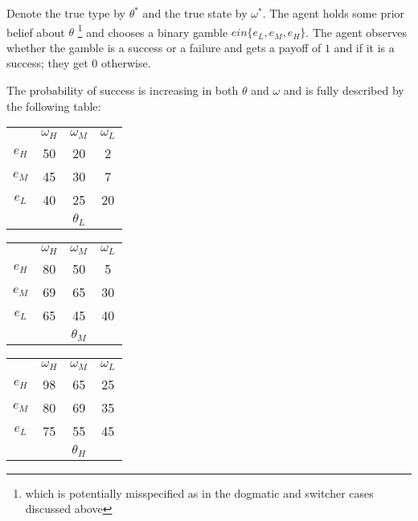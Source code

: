 \documentclass[
  12pt,
]{article}
\begin{document}
Denote the true type by \(\theta^*\) and the true state by \(\omega^*\).
The agent holds some prior belief about \(\theta\)
\footnote{which is potentially misspecified as in the dogmatic and switcher cases discussed above}
and chooses a binary gamble \(e in \{e_L, e_M, e_H\}\). The agent
observes whether the gamble is a success or a failure and gets a payoff
of \(1\) and if it is a success; they get \(0\) otherwise.

The probability of success is increasing in both \(\theta\) and
\(\omega\) and is fully described by the following table:

\begin{tabular}{ c|c|c|c|}
  
  \multicolumn{1}{c}{} & \multicolumn{1}{c}{$\omega_H$} & \multicolumn{1}{c}{$\omega_M$} & \multicolumn{1}{c}{$\omega_L$}\\
  \cline{2-4}
  $e_H$ & 50 & 20 & 2 \\
  \cline{2-4}
  $e_M$ & 45 & 30 & 7 \\
  \cline{2-4}
  $e_L$ & 40 & 25 & 20 \\

  \cline{2-4}
  \multicolumn{1}{c}{} & \multicolumn{1}{c}{} & \multicolumn{1}{c}{$\theta_L$} & \multicolumn{1}{c}{}\\
\end{tabular}
\hspace{.3cm} 
\begin{tabular}{ c|c|c|c|}
  
  \multicolumn{1}{c}{} & \multicolumn{1}{c}{$\omega_H$} & \multicolumn{1}{c}{$\omega_M$} & \multicolumn{1}{c}{$\omega_L$}\\
  \cline{2-4}
  $e_H$ & 80 & 50 & 5 \\
  \cline{2-4}
  $e_M$ & 69 & 65 & 30 \\
  \cline{2-4}
  $e_L$ & 65 & 45 & 40 \\
  \cline{2-4}
  \multicolumn{1}{c}{} & \multicolumn{1}{c}{} & \multicolumn{1}{c}{$\theta_M$} & \multicolumn{1}{c}{}\\
\end{tabular}
\hspace{.3cm} 
\begin{tabular}{ c|c|c|c|}
  
  \multicolumn{1}{c}{} & \multicolumn{1}{c}{$\omega_H$} & \multicolumn{1}{c}{$\omega_M$} & \multicolumn{1}{c}{$\omega_L$}\\
  \cline{2-4}
  $e_H$ & 98 & 65 & 25 \\
  \cline{2-4}
  $e_M$ & 80 & 69 & 35 \\
  \cline{2-4}
  $e_L$ & 75 & 55 & 45 \\
  \cline{2-4}
  \multicolumn{1}{c}{} & \multicolumn{1}{c}{} & \multicolumn{1}{c}{$\theta_H$} & \multicolumn{1}{c}{}\\
\end{tabular}
\end{document}
